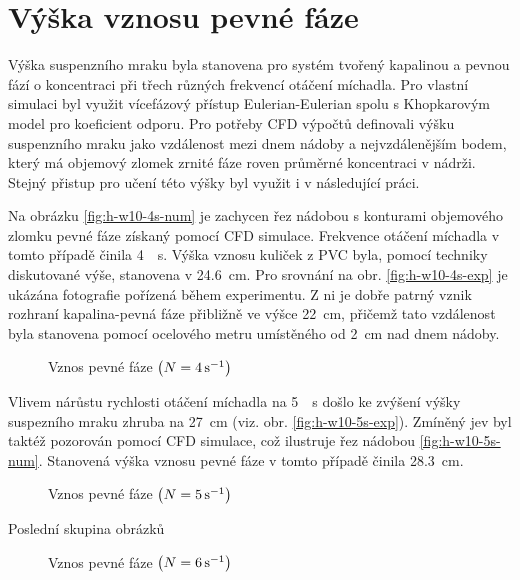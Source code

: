 \section{Výška vznosu pevné fáze}
Výška suspenzního mraku byla stanovena pro systém tvořený kapalinou \pvpS{} a pevnou fází o koncentraci  při třech různých frekvencí otáčení míchadla. Pro vlastní simulaci byl využit vícefázový přístup Eulerian-Eulerian spolu s Khopkarovým model pro koeficient odporu. Pro potřeby CFD výpočtů \citet{kas08} definovali výšku suspenzního mraku jako vzdálenost mezi dnem nádoby a nejvzdálenějším bodem, který má objemový zlomek zrnité fáze roven průměrné koncentraci v nádrži. Stejný přistup pro učení této výšky byl využit i v následující práci.  

Na obrázku \ref{fig:h-w10-4s-num} je zachycen řez nádobou s konturami objemového zlomku pevné fáze získaný pomocí CFD simulace. Frekvence otáčení míchadla v tomto případě činila \SI{4}{\per\second}. Výška vznosu kuliček z PVC byla, pomocí techniky diskutované výše, stanovena v \SI{24.6}{\centi\meter}. Pro srovnání na obr. \ref{fig:h-w10-4s-exp} je ukázána fotografie pořízená během experimentu. Z ni je dobře patrný vznik rozhraní kapalina-pevná fáze přibližně ve výšce \SI{22}{\centi\meter}, přičemž tato vzdálenost byla stanovena pomocí ocelového metru umístěného od \SI{2}{\centi\meter} nad dnem nádoby.

\begin{figure}[h!]
 \centering
  \qquad 
  \caption{Vznos pevné fáze $\left( N=\SI{4}{\per\second} \right)$}
  \label{fig:h-w10-4s}
\end{figure}

Vlivem nárůstu rychlosti otáčení míchadla na \SI{5}{\per\second} došlo ke zvýšení výšky suspezního mraku zhruba na \SI{27}{\centi\meter} (viz. obr. \ref{fig:h-w10-5s-exp}). Zmíněný jev byl taktéž pozorován pomocí CFD simulace, což ilustruje řez nádobou \ref{fig:h-w10-5s-num}. Stanovená výška vznosu pevné fáze v tomto případě činila \SI{28.3}{\centi\meter}. 
\newpage

\begin{figure}[t!]
 \centering
  \qquad 
  \caption{Vznos pevné fáze $\left( N=\SI{5}{\per\second} \right)$}
  \label{fig:h-w10-5s}
\end{figure}
Poslední skupina obrázků
\begin{figure}[h!]
 \centering
  \qquad 
  \caption{Vznos pevné fáze $\left( N=\SI{6}{\per\second} \right)$}
  \label{fig:h-w10-6s}
\end{figure}

